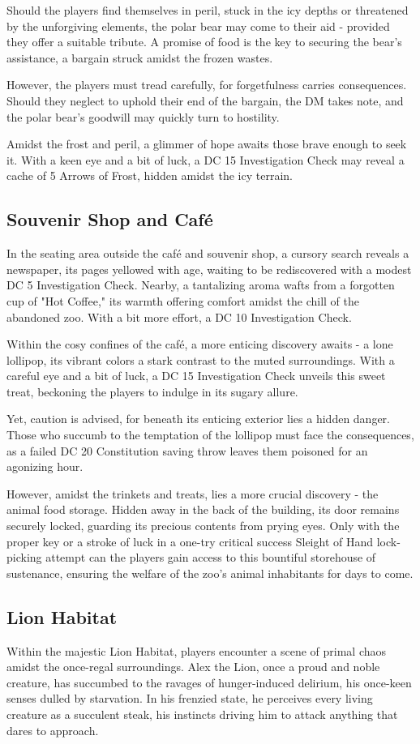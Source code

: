 Should the players find themselves in peril, stuck in the icy depths or threatened by the unforgiving elements, the polar bear may come to their aid - provided they offer a suitable tribute. A promise of food is the key to securing the bear's assistance, a bargain struck amidst the frozen wastes.

However, the players must tread carefully, for forgetfulness carries consequences. Should they neglect to uphold their end of the bargain, the DM takes note, and the polar bear's goodwill may quickly turn to hostility.

Amidst the frost and peril, a glimmer of hope awaits those brave enough to seek it. With a keen eye and a bit of luck, a DC 15 Investigation Check may reveal a cache of 5 Arrows of Frost, hidden amidst the icy terrain.
\subsection*{ Souvenir Shop and Café}
In the seating area outside the café and souvenir shop, a cursory search reveals a newspaper, its pages yellowed with age, waiting to be rediscovered with a modest DC 5 Investigation Check. Nearby, a tantalizing aroma wafts from a forgotten cup of "Hot Coffee," its warmth offering comfort amidst the chill of the abandoned zoo. With a bit more effort, a DC 10 Investigation Check.

Within the cosy confines of the café, a more enticing discovery awaits - a lone lollipop, its vibrant colors a stark contrast to the muted surroundings. With a careful eye and a bit of luck, a DC 15 Investigation Check unveils this sweet treat, beckoning the players to indulge in its sugary allure.

Yet, caution is advised, for beneath its enticing exterior lies a hidden danger. Those who succumb to the temptation of the lollipop must face the consequences, as a failed DC 20 Constitution saving throw leaves them poisoned for an agonizing hour.

However, amidst the trinkets and treats, lies a more crucial discovery - the animal food storage. Hidden away in the back of the building, its door remains securely locked, guarding its precious contents from prying eyes. Only with the proper key or a stroke of luck in a one-try critical success Sleight of Hand lock-picking attempt can the players gain access to this bountiful storehouse of sustenance, ensuring the welfare of the zoo's animal inhabitants for days to come.
\subsection*{ Lion Habitat}
Within the majestic Lion Habitat, players encounter a scene of primal chaos amidst the once-regal surroundings. Alex the Lion, once a proud and noble creature, has succumbed to the ravages of hunger-induced delirium, his once-keen senses dulled by starvation. In his frenzied state, he perceives every living creature as a succulent steak, his instincts driving him to attack anything that dares to approach.

